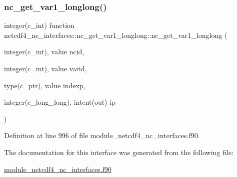 \subsubsection{\texorpdfstring{nc\+\_\+get\+\_\+var1\+\_\+longlong()}{nc\_get\_var1\_longlong()}}
{\footnotesize\ttfamily integer(c\+\_\+int) function netcdf4\+\_\+nc\+\_\+interfaces\+::nc\+\_\+get\+\_\+var1\+\_\+longlong\+::nc\+\_\+get\+\_\+var1\+\_\+longlong (\begin{DoxyParamCaption}\item[{integer(c\+\_\+int), value}]{ncid,  }\item[{integer(c\+\_\+int), value}]{varid,  }\item[{type(c\+\_\+ptr), value}]{indexp,  }\item[{integer(c\+\_\+long\+\_\+long), intent(out)}]{ip }\end{DoxyParamCaption})}



Definition at line 996 of file module\+\_\+netcdf4\+\_\+nc\+\_\+interfaces.\+f90.



The documentation for this interface was generated from the following file\+:\begin{DoxyCompactItemize}
\item 
\hyperlink{module__netcdf4__nc__interfaces_8f90}{module\+\_\+netcdf4\+\_\+nc\+\_\+interfaces.\+f90}\end{DoxyCompactItemize}
